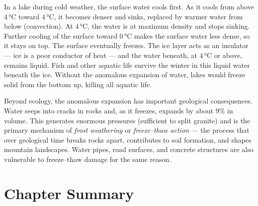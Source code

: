 \begin{realworldbox}
In a lake during cold weather, the surface water cools
first. As it cools from above $4\,°\text{C}$ toward
$4\,°\text{C}$, it becomes denser and sinks, replaced
by warmer water from below (convection). At
$4\,°\text{C}$, the water is at maximum density and
stops sinking. Further cooling of the surface toward
$0\,°\text{C}$ makes the surface water less dense, so
it stays on top. The surface eventually freezes.
The ice layer acts as an insulator --- ice is a poor
conductor of heat --- and the water beneath, at
$4\,°\text{C}$ or above, remains liquid. Fish and other
aquatic life survive the winter in this liquid water
beneath the ice. Without the anomalous expansion of
water, lakes would freeze solid from the bottom up,
killing all aquatic life.

Beyond ecology, the anomalous expansion has important
geological consequences. Water seeps into cracks in
rocks and, as it freezes, expands by about $9\%$ in
volume. This generates enormous pressures (sufficient
to split granite) and is the primary mechanism of
\textit{frost weathering} or \textit{freeze--thaw
action} --- the process that over geological time
breaks rocks apart, contributes to soil formation,
and shapes mountain landscapes. Water pipes, road
surfaces, and concrete structures are also vulnerable
to freeze--thaw damage for the same reason.
\end{realworldbox}

\section{Chapter Summary}

